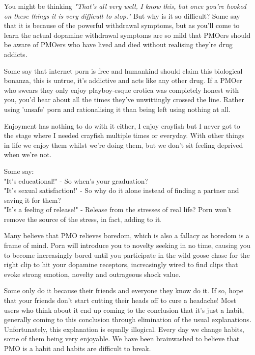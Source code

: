\documentclass[easypeasy.tex]{subfiles}
\begin{document}
You might be thinking \textit{"That's all very well, I know this, but once you're hooked on these things it is very difficult to stop."} But why is it so difficult? Some say that it is because of the powerful withdrawal symptoms, but as you'll come to learn the actual dopamine withdrawal symptoms are so mild that PMOers should be aware of PMOers who have lived and died without realising they're drug addicts.

Some say that internet porn is free and humankind should claim this biological bonanza, this is untrue, it's addictive and acts like any other drug. If a PMOer who swears they only enjoy playboy-esque erotica was completely honest with you, you'd hear about all the times they've unwittingly crossed the line. Rather using 'unsafe' porn and rationalising it than being left using nothing at all.

Enjoyment has nothing to do with it either, I enjoy crayfish but I never got to the stage where I needed crayfish multiple times or everyday. With other things in life we enjoy them whilst we're doing them, but we don't sit feeling deprived when we're not.

Some say:\\
  "It's educational!" - So when's your graduation?\\
  "It's sexual satisfaction!" - So why do it alone instead of finding a partner and saving it for them?\\
  "It's a feeling of release!" - Release from the stresses of real life? Porn won't remove the source of the stress, in fact, adding to it.

Many believe that PMO relieves boredom, which is also a fallacy as boredom is a frame of mind. Porn will introduce you to novelty seeking in no time, causing you to become increasingly bored until you participate in the wild goose chase for the right clip to hit your dopamine receptors, increasingly wired to find clips that evoke strong emotion, novelty and outrageous shock value.

Some only do it because their friends and everyone they know do it. If so, hope that your friends don't start cutting their heads off to cure a headache! Most users who think about it end up coming to the conclusion that it's just a habit, generally coming to this conclusion through elimination of the usual explanations. Unfortunately, this explanation is equally illogical. Every day we change habits, some of them being very enjoyable. We have been brainwashed to believe that PMO is a habit and habits are difficult to break.
\end{document}
